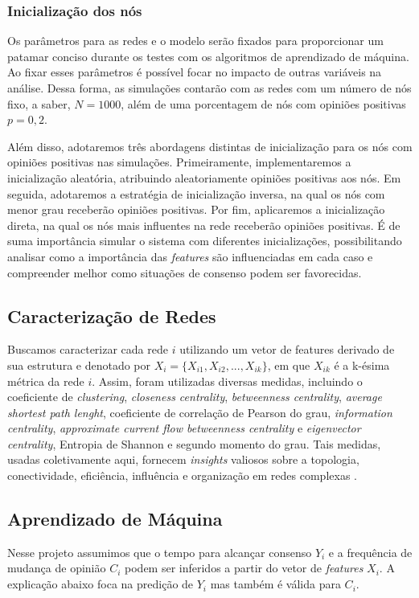 \documentclass{article}
\begin{document}
\subsubsection{Inicialização dos nós}
Os parâmetros para as redes e o modelo serão fixados para proporcionar um patamar conciso durante os testes com os algoritmos de aprendizado de máquina. Ao fixar esses parâmetros é possível focar no impacto de outras variáveis na análise. Dessa forma, as simulações contarão com as redes com um número de nós fixo, a saber, $N=1000$, além de uma porcentagem de nós com opiniões positivas $p = 0,2$. 

Além disso, adotaremos três abordagens distintas de inicialização para os nós com opiniões positivas nas simulações. Primeiramente, implementaremos a inicialização aleatória, atribuindo aleatoriamente opiniões positivas aos nós. Em seguida, adotaremos a estratégia de inicialização inversa, na qual os nós com menor grau receberão opiniões positivas. Por fim, aplicaremos a inicialização direta, na qual os nós mais influentes na rede receberão opiniões positivas. É de suma importância simular o sistema com diferentes inicializações, possibilitando analisar como a importância das \textit{features} são influenciadas em cada caso e compreender melhor como situações de consenso podem ser favorecidas.

\subsection{Caracterização de Redes}
Buscamos caracterizar cada rede $i$ utilizando um vetor de features derivado de sua estrutura e denotado por $X_i=\{X_{i1}, X_{i2}, ...,X_{ik}\}$, em que $X_{ik}$ é a k-ésima métrica da rede $i$. Assim, foram utilizadas diversas medidas, incluindo o coeficiente de \textit{clustering}, \textit{closeness centrality}, \textit{betweenness centrality}, \textit{average shortest path lenght}, coeficiente de correlação de Pearson do grau, \textit{information centrality}, \textit{approximate current flow betweenness centrality} e \textit{eigenvector centrality}, Entropia de Shannon e segundo momento do grau. Tais medidas, usadas coletivamente aqui, fornecem \textit{insights} valiosos sobre a topologia, conectividade, eficiência, influência e organização em redes complexas \cite{costa2007characterization}. 

\subsection{Aprendizado de Máquina}
Nesse projeto assumimos que o tempo para alcançar consenso $Y_i$ e a frequência de mudança de opinião $C_i$ podem ser inferidos a partir do vetor de \textit{features} $X_i$. A explicação abaixo foca na predição de $Y_i$ mas também é válida para $C_i$. 
\end{document}
